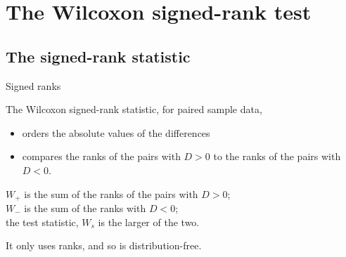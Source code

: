 % 
% 
% 
% 
% 
% 

\section{The Wilcoxon signed-rank test}

\subsection{The signed-rank statistic}

\begin{frame}{Signed ranks}

    The Wilcoxon signed-rank statistic, for paired sample data,
    \begin{itemize}
        \item orders the \alert{absolute values} of the differences
        \item compares the ranks of the pairs with $D>0$ to the ranks of the pairs with $D<0$.
    \end{itemize}

    \vspace{2em}

    $W_+$ is the sum of the ranks of the pairs with $D>0$; \\
    $W_-$ is the sum of the ranks with $D<0$; \\
    the \alert{test statistic}, $W_s$ is the larger of the two.

    \vspace{2em}

    It only uses \alert{ranks},
    and so is distribution-free.

\end{frame}


